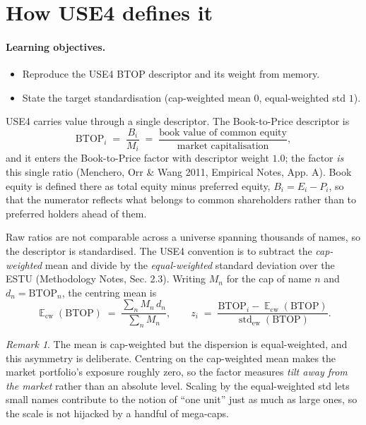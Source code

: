 \documentclass[11pt]{article}
\theoremstyle{definition}
\theoremstyle{plain}
\theoremstyle{remark}
\newtheorem*{remark}{Remark}
\DeclareMathOperator{\std}{std}
\DeclareMathOperator*{\avg}{\mathbb{E}}
\begin{document}
\section{How USE4 defines it}\label{sec:def}

\paragraph{Learning objectives.}
\begin{itemize}[leftmargin=1.4em,nosep]
  \item Reproduce the USE4 BTOP descriptor and its weight from memory.
  \item State the target standardisation (cap-weighted mean $0$, equal-weighted std $1$).
\end{itemize}

USE4 carries value through a single descriptor. The Book-to-Price descriptor is
\[
  \mathrm{BTOP}_i \;=\; \frac{B_i}{M_i}
  \;=\; \frac{\text{book value of common equity}}{\text{market capitalisation}},
\]
and it enters the Book-to-Price factor with descriptor weight $1.0$; the factor \emph{is} this single ratio (Menchero, Orr \& Wang 2011, Empirical Notes, App. A). Book equity is defined there as total equity minus preferred equity, $B_i = E_i - P_i$, so that the numerator reflects what belongs to common shareholders rather than to preferred holders ahead of them.

Raw ratios are not comparable across a universe spanning thousands of names, so the descriptor is standardised. The USE4 convention is to subtract the \emph{cap-weighted} mean and divide by the \emph{equal-weighted} standard deviation over the ESTU (Methodology Notes, Sec. 2.3). Writing $M_n$ for the cap of name $n$ and $d_n=\mathrm{BTOP}_n$, the centring mean is
\[
  \avg_{\mathrm{cw}}(\mathrm{BTOP}) \;=\; \frac{\sum_n M_n\, d_n}{\sum_n M_n},
  \qquad
  z_i \;=\; \frac{\mathrm{BTOP}_i - \avg_{\mathrm{cw}}(\mathrm{BTOP})}
                  {\std_{\mathrm{ew}}(\mathrm{BTOP})}.
\]

\begin{remark}
The mean is cap-weighted but the dispersion is equal-weighted, and this asymmetry is deliberate. Centring on the cap-weighted mean makes the market portfolio's exposure roughly zero, so the factor measures \emph{tilt away from the market} rather than an absolute level. Scaling by the equal-weighted std lets small names contribute to the notion of ``one unit'' just as much as large ones, so the scale is not hijacked by a handful of mega-caps.
\end{remark}
\end{document}

